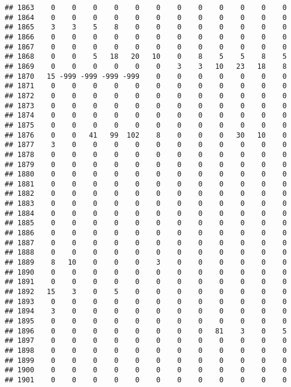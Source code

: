 \documentclass[]{article}
\begin{document}
\begin{verbatim}
## 1863    0    0    0    0    0    0    0    0    0    0    0    0
## 1864    0    0    0    0    0    0    0    0    0    0    0    0
## 1865    3    3    5    8    0    0    0    0    0    0    0    0
## 1866    0    0    0    0    0    0    0    0    0    0    0    0
## 1867    0    0    0    0    0    0    0    0    0    0    0    0
## 1868    0    0    5   18   20   10    0    8    5    5    8    5
## 1869    0    0    0    0    0    0    3    3   10   23   18    8
## 1870   15 -999 -999 -999 -999    0    0    0    0    0    0    0
## 1871    0    0    0    0    0    0    0    0    0    0    0    0
## 1872    0    0    0    0    0    0    0    0    0    0    0    0
## 1873    0    0    0    0    0    0    0    0    0    0    0    0
## 1874    0    0    0    0    0    0    0    0    0    0    0    0
## 1875    0    0    0    0    0    0    0    0    0    0    0    0
## 1876    0    0   41   99  102    8    0    0    0   30   10    0
## 1877    3    0    0    0    0    0    0    0    0    0    0    0
## 1878    0    0    0    0    0    0    0    0    0    0    0    0
## 1879    0    0    0    0    0    0    0    0    0    0    0    0
## 1880    0    0    0    0    0    0    0    0    0    0    0    0
## 1881    0    0    0    0    0    0    0    0    0    0    0    0
## 1882    0    0    0    0    0    0    0    0    0    0    0    0
## 1883    0    0    0    0    0    0    0    0    0    0    0    0
## 1884    0    0    0    0    0    0    0    0    0    0    0    0
## 1885    0    0    0    0    0    0    0    0    0    0    0    0
## 1886    0    0    0    0    0    0    0    0    0    0    0    0
## 1887    0    0    0    0    0    0    0    0    0    0    0    0
## 1888    0    0    0    0    0    0    0    0    0    0    0    0
## 1889    8   10    0    0    0    3    0    0    0    0    0    0
## 1890    0    0    0    0    0    0    0    0    0    0    0    0
## 1891    0    0    0    0    0    0    0    0    0    0    0    0
## 1892   15    3    0    5    0    0    0    0    0    0    0    0
## 1893    0    0    0    0    0    0    0    0    0    0    0    0
## 1894    3    0    0    0    0    0    0    0    0    0    0    0
## 1895    0    0    0    0    0    0    0    0    0    0    0    0
## 1896    0    0    0    0    0    0    0    0   81    3    0    5
## 1897    0    0    0    0    0    0    0    0    0    0    0    0
## 1898    0    0    0    0    0    0    0    0    0    0    0    0
## 1899    0    0    0    0    0    0    0    0    0    0    0    0
## 1900    0    0    0    0    0    0    0    0    0    0    0    0
## 1901    0    0    0    0    0    0    0    0    0    0    0    0

\end{verbatim}
\end{document}
